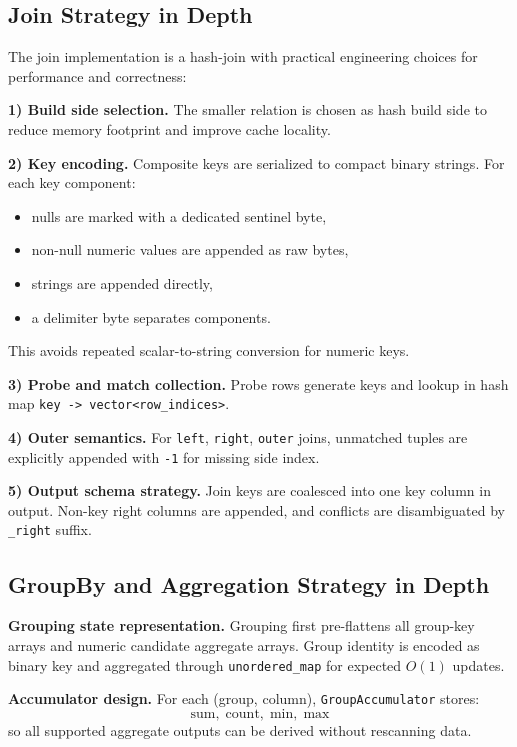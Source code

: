 \documentclass[11pt,a4paper]{article}
\begin{document}
\subsection{Join Strategy in Depth}
The join implementation is a hash-join with practical engineering choices for performance and correctness:

\textbf{1) Build side selection.} The smaller relation is chosen as hash build side to reduce memory footprint and improve cache locality.

\textbf{2) Key encoding.} Composite keys are serialized to compact binary strings. For each key component:
\begin{itemize}[leftmargin=*]
	\item nulls are marked with a dedicated sentinel byte,
	\item non-null numeric values are appended as raw bytes,
	\item strings are appended directly,
	\item a delimiter byte separates components.
\end{itemize}
This avoids repeated scalar-to-string conversion for numeric keys.

\textbf{3) Probe and match collection.} Probe rows generate keys and lookup in hash map \texttt{key -> vector<row\_indices>}.

\textbf{4) Outer semantics.} For \texttt{left}, \texttt{right}, \texttt{outer} joins, unmatched tuples are explicitly appended with \texttt{-1} for missing side index.

\textbf{5) Output schema strategy.} Join keys are coalesced into one key column in output. Non-key right columns are appended, and conflicts are disambiguated by \texttt{\_right} suffix.

\subsection{GroupBy and Aggregation Strategy in Depth}

\textbf{Grouping state representation.} Grouping first pre-flattens all group-key arrays and numeric candidate aggregate arrays. Group identity is encoded as binary key and aggregated through \texttt{unordered\_map} for expected \(O(1)\) updates.

\textbf{Accumulator design.} For each (group, column), \texttt{GroupAccumulator} stores:
\[
\text{sum},\; \text{count},\; \text{min},\; \text{max}
\]
so all supported aggregate outputs can be derived without rescanning data.
\end{document}
